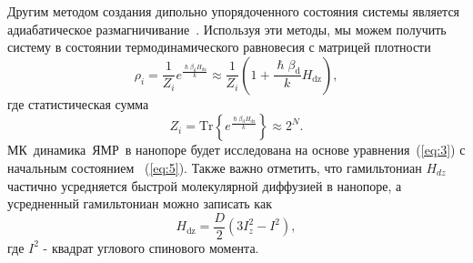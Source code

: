 \documentclass[utf8]{jetp}
\newcommand{\hdz}{H_\mathrm{dz}}
\begin{document}
Другим методом создания  дипольно упорядоченного состояния системы является адиабатическое размагничивание~\cite{Goldman_1970,Slichter_1961}.
Используя эти методы, мы можем получить систему в состоянии термодинамического равновесия с матрицей плотности
%
\begin{equation}
  \label{eq:5}
  \rho_i = \frac{1}{Z_i} e^\frac{\hslash\beta_\mathrm{d} \hdz}{k}
  \approx \frac{1}{Z_i}(1 + \frac{\hslash\beta_\mathrm{d}}{k} H_\mathrm{dz}),
\end{equation}
%
где статистическая сумма
%
\begin{equation}
  \label{eq:6}
	Z_i = \mathrm{Tr} \left\{ e^\frac{\hslash\beta_\mathrm{d} \hdz}{k} \right\} \approx 2^{N}.
\end{equation}
%
МК~динамика~ЯМР~в нанопоре будет исследована на основе уравнения~(\ref{eq:3}) с начальным состоянием ~(\ref{eq:5}).
Также важно отметить, что гамильтониан $H_{dz}$ частично усредняется быстрой молекулярной диффузией в нанопоре, а усредненный гамильтониан можно записать как \cite{Fel_dman_2004,Doronin_2011}
%
\begin{equation}
  \label{eq:7}
  H_\mathrm{dz} = \dfrac{D}{2} (3 I^{2}_{z} - I^{2}) , %
\end{equation}
%
где $I^{2}$ - квадрат углового спинового  момента.
\end{document}
